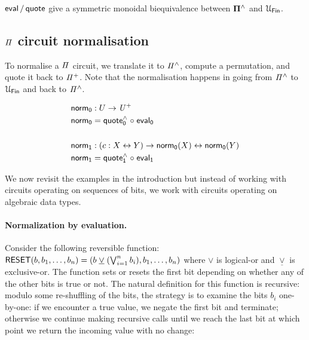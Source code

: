 \begin{proposition}
  $\evalt/\quotet$ give a symmetric monoidal biequivalence between $\mathbf{\Pi^{\wedge}}$ and $\UFin$.
\end{proposition}

\subsection{$\mathit{\Pi}$ circuit normalisation}

To normalise a $\mathit{\Pi}$ circuit, we translate it to $\mathit{{\Pi}^{\wedge}}$, compute a permutation, and quote it back to
$\mathit{{\Pi}^{+}}$. Note that the normalisation happens in going from $\mathit{{\Pi}^{\wedge}}$ to $\UFin$ and back to $\mathit{{\Pi}^{\wedge}}$.

\begin{definition}
  \begin{align*}
    \normt_{0} & : U \to \UPlus                                        \\
    \normt_{0} & = \quoteh_{0} \comp \evalt_{0}                        \\
    \\
    \normt_{1} & : (c : X \iso Y) \to \normt_{0}(X) \iso \normt_{0}(Y) \\
    \normt_{1} & = \quoteh_{1} \comp \evalt_{1}
  \end{align*}
\end{definition}

We now revisit the examples in the introduction but instead of working with circuits operating on sequences of bits, we
work with circuits operating on algebraic data types.

\paragraph*{Normalization by evaluation.} Consider the following reversible function:
$\Afun{RESET}(b,b_1,\ldots,b_n) = (b \; \underline{\vee} \; (\bigvee_{i=1}^n b_i),b_1,\ldots,b_n)$ where $\vee$ is
logical-or and $\underline{\vee}$ is exclusive-or. The function sets or resets the first bit depending on whether any of
the other bits is true or not. The natural definition for this function is recursive: modulo some re-shuffling of the
bits, the strategy is to examine the bits $b_i$ one-by-one: if we encounter a true value, we negate the first bit and
terminate; otherwise we continue making recursive calls until we reach the last bit at which point we return the
incoming value with no change:


